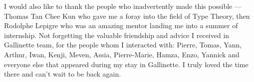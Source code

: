 I would also like to thank the people who inadvertently made this possible ---
Thomas Tan Chee Kun who gave me a foray into the field of Type Theory, then
Rodolphe Lepigre who was an amazing mentor landing me into a summer of internship.
Not forgetting the valuable friendship and advice I received in Gallinette team,
for the people whom I interacted with: Pierre, Tomas, Yann, Arthur, Iwan, Kenji,
Meven, Assia, Pierre-Marie, Hamza, Enzo, Yannick and everyone else that appeared
during my stay in Gallinette. I truly loved the time there and can't wait to be
back again.





\begingroup %

\hypersetup{linkcolor=.} %
\setlength{\textheight}{230\vscale} %

\etocstandarddisplaystyle %
\etocstandardlines %
\setcounter{tocdepth}{\subsectiontocdepth}

\tableofcontents %


\let\cleardoublepage\bigskip
\let\clearpage\bigskip


\endgroup
